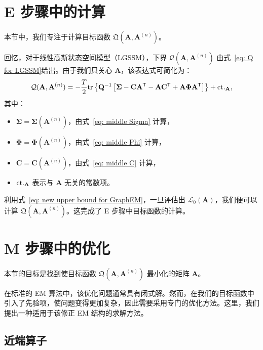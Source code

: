 \section{E 步骤中的计算}

本节中，我们专注于计算目标函数 \(\mathfrak{Q}(\mathbf{A}, \mathbf{A}^{(n)})\)。

回忆，对于线性高斯状态空间模型（LGSSM），下界 \(\mathcal{Q}(\mathbf{A}, \mathbf{A}^{(n)})\) 由式~\eqref{eq: Q for LGSSM}给出。由于我们只关心 \(\mathbf{A}\)，该表达式可简化为：
\begin{align*}
    \mathcal{Q}(\mathbf{A}, \mathbf{A}^{(n)}) = - \frac{T}{2} \textrm{tr} \left\{ \mathbf{Q}^{-1} \left[ \boldsymbol{\Sigma} - \mathbf{C} \mathbf{A}^{\mathsf{T}} - \mathbf{A} \mathbf{C}^{\mathsf{T}} + \mathbf{A} \boldsymbol{\Phi} \mathbf{A}^{\mathsf{T}} \right] \right\} + \mathrm{ct.}_{\mathbf{A}},
\end{align*}
其中：
\begin{itemize}
    \item \(\boldsymbol{\Sigma} = \boldsymbol{\Sigma}(\mathbf{A}^{(n)})\)，由式~\eqref{eq: middle Sigma} 计算，
    \item \(\boldsymbol{\Phi} = \boldsymbol{\Phi}(\mathbf{A}^{(n)})\)，由式~\eqref{eq: middle Phi} 计算，
    \item \(\mathbf{C} = \mathbf{C}(\mathbf{A}^{(n)})\)，由式~\eqref{eq: middle C} 计算，
    \item \(\mathrm{ct.}_{\mathbf{A}}\) 表示与 \(\mathbf{A}\) 无关的常数项。
\end{itemize}

利用式~\eqref{eq: new upper bound for GraphEM}，一旦评估出 \(\mathcal{L}_0(\mathbf{A})\)，我们便可以计算 \(\mathfrak{Q}(\mathbf{A}, \mathbf{A}^{(n)})\)。这完成了 E 步骤中目标函数的计算。

\section{M 步骤中的优化}

本节的目标是找到使目标函数 \(\mathfrak{Q}(\mathbf{A}, \mathbf{A}^{(n)})\) 最小化的矩阵 \(\mathbf{A}\)。

在标准的 EM 算法中，该优化问题通常具有闭式解。然而，在我们的目标函数中引入了先验项，使问题变得更加复杂，因此需要采用专门的优化方法。这里，我们提出一种适用于该修正 EM 结构的求解方法。

\subsection{近端算子}

